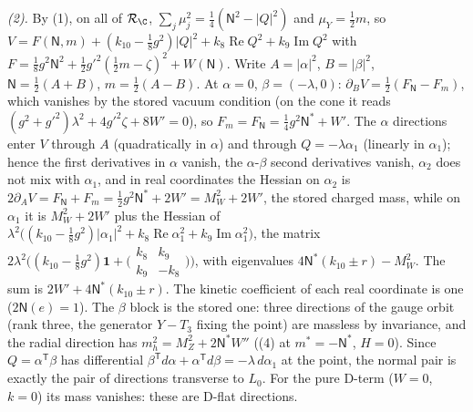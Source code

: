 \emph{(2).} By (1), on all of $\mathcal{R}_{\C}$, $\sum_{j}\mu_{j}^{2} = \tfrac14(\mathsf{N}^{2} - |Q|^{2})$ and $\mu_{Y} = \tfrac12 m$, so $V = F(\mathsf{N}, m) + (k_{10} - \tfrac18 g^{2})|Q|^{2} + k_{8}\operatorname{Re}Q^{2} + k_{9}\operatorname{Im}Q^{2}$ with $F = \tfrac18 g^{2}\mathsf{N}^{2} + \tfrac12 g'^{2}(\tfrac12 m - \zeta)^{2} + W(\mathsf{N})$. Write $A = |\alpha|^{2}$, $B = |\beta|^{2}$, $\mathsf{N} = \tfrac12(A + B)$, $m = \tfrac12(A - B)$. At $\alpha = 0$, $\beta = (-\lambda, 0)$: $\partial_{B}V = \tfrac12(F_{\mathsf{N}} - F_{m})$, which vanishes by the stored vacuum condition (on the cone it reads $(g^{2} + g'^{2})\lambda^{2} + 4g'^{2}\zeta + 8W' = 0$), so $F_{m} = F_{\mathsf{N}} = \tfrac14 g^{2}\mathsf{N}^{*} + W'$. The $\alpha$ directions enter $V$ through $A$ (quadratically in $\alpha$) and through $Q = -\lambda\alpha_{1}$ (linearly in $\alpha_{1}$); hence the first derivatives in $\alpha$ vanish, the $\alpha$-$\beta$ second derivatives vanish, $\alpha_{2}$ does not mix with $\alpha_{1}$, and in real coordinates the Hessian on $\alpha_{2}$ is $2\partial_{A}V = F_{\mathsf{N}} + F_{m} = \tfrac12 g^{2}\mathsf{N}^{*} + 2W' = M_{W}^{2} + 2W'$, the stored charged mass, while on $\alpha_{1}$ it is $M_{W}^{2} + 2W'$ plus the Hessian of $\lambda^{2}\bigl((k_{10} - \tfrac18 g^{2})|\alpha_{1}|^{2} + k_{8}\operatorname{Re}\alpha_{1}^{2} + k_{9}\operatorname{Im}\alpha_{1}^{2}\bigr)$, the matrix $2\lambda^{2}\bigl((k_{10} - \tfrac18 g^{2})\mathbf{1} + \bigl(\begin{smallmatrix}k_{8} & k_{9}\\ k_{9} & -k_{8}\end{smallmatrix}\bigr)\bigr)$, with eigenvalues $4\mathsf{N}^{*}(k_{10} \pm r) - M_{W}^{2}$. The sum is $2W' + 4\mathsf{N}^{*}(k_{10} \pm r)$. The kinetic coefficient of each real coordinate is one ($2\mathsf{N}(e) = 1$). The $\beta$ block is the stored one: three directions of the gauge orbit (rank three, the generator $Y - T_{3}$ fixing the point) are massless by invariance, and the radial direction has $m_{h}^{2} = M_{Z}^{2} + 2\mathsf{N}^{*}W''$ ((4) at $m^{*} = -\mathsf{N}^{*}$, $H = 0$). Since $Q = \alpha^{\mathsf T}\beta$ has differential $\beta^{\mathsf T}d\alpha + \alpha^{\mathsf T}d\beta = -\lambda\,d\alpha_{1}$ at the point, the normal pair is exactly the pair of directions transverse to $L_{0}$. For the pure D-term ($W = 0$, $k = 0$) its mass vanishes: these are D-flat directions.

